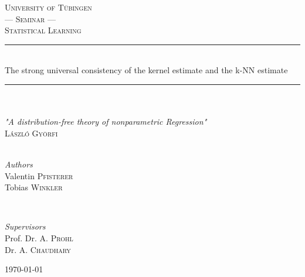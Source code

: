 

\begin{titlepage}
	\newcommand{\HRule}{\rule{\linewidth}{0.1mm}} 
	\center
	
    \textsc{\LARGE University of Tübingen}\\ [1.5cm] 
	
	\textsc{\large --- Seminar --- \\ Statistical Learning}\\[0.5cm] 
	
	\HRule\\[0.6cm]
 
	{\LARGE The strong universal consistency of the kernel estimate and the k-NN estimate}\\[0.2cm] 
 
	\HRule\\[1.0cm]

     \\
    \textsl{"A distribution-free theory of nonparametric Regression"}\\
     \textsc{László Györfi}\\[0.5cm]
    \text{\newline}
    
	
	\begin{minipage}{0.4\textwidth}
		\begin{flushleft}
			\large
			\textit{\\Authors}\\
			    Valentin \textsc{Pfisterer} \\
                Tobias \textsc{Winkler}
		\end{flushleft}
	\end{minipage}
	~
	\begin{minipage}{0.4\textwidth}
		\begin{flushright}
			\large
			\textit{Supervisors}\\
			Prof. Dr. A. \textsc{Prohl} \\ 
            Dr. A. \textsc{Chaudhary}
		\end{flushright}
	\end{minipage}	
	
	\vfill\vfill\vfill 
 
	{\large\today}
 
	\vfill 
	
\end{titlepage}

